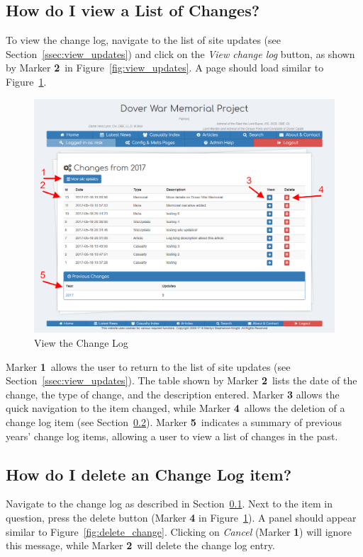 \documentclass[12pt]{article}
\newcommand{\marker}[1]{Marker \color{red}\textbf{#1}\color{black}}
\begin{document}
\newpage
\FloatBarrier
\subsection{How do I view a List of Changes?}\label{ssec:changeLog}
To view the change log, navigate to the list of site updates (see Section~\ref{ssec:view_updates}) and click on the \textit{View change log} button, as shown by \marker{2}\ in Figure~\ref{fig:view_updates}. A page should load similar to Figure~\ref{fig:view_changes}.

\begin{figure}[h]
  \centering
 \includegraphics[width=.9\textwidth]{pics/view_changes.png}
	\caption{View the Change Log}\label{fig:view_changes}
\end{figure}

\marker{1}\ allows the user to return to the list of site updates (see Section~\ref{ssec:view_updates}). The table shown by \marker{2}\ lists the date of the change, the type of change, and the description entered. \marker{3} allows the quick navigation to the item changed, while \marker{4}\ allows the deletion of a change log item (see Section~\ref{ssec:delete_change}). \marker{5}\ indicates a summary of previous years' change log items, allowing a user to view a list of changes in the past.

\newpage
\FloatBarrier
\subsection{How do I delete an Change Log item?}\label{ssec:delete_change}
Navigate to the change log as described in Section~\ref{ssec:changeLog}. Next to the item in question, press the delete button (\marker{4} in Figure~\ref{fig:view_changes}). A panel should appear similar to Figure~\ref{fig:delete_change}. Clicking on \textit{Cancel} (\marker{1}) will ignore this message, while \marker{2}\ will delete the change log entry.
\end{document}
